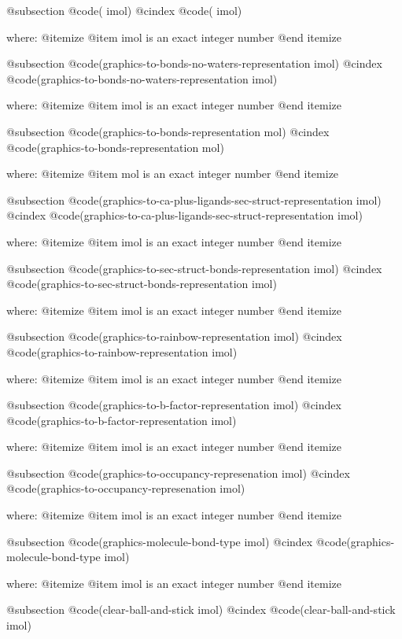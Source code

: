 @subsection @code{( imol)}
@cindex @code{( imol)}
 
where: 
 @itemize 
     @item imol is an exact integer number
 @end itemize


@subsection @code{(graphics-to-bonds-no-waters-representation imol)}
@cindex @code{(graphics-to-bonds-no-waters-representation imol)}
 
where: 
 @itemize 
     @item imol is an exact integer number
 @end itemize


@subsection @code{(graphics-to-bonds-representation mol)}
@cindex @code{(graphics-to-bonds-representation mol)}
 
where: 
 @itemize 
     @item mol is an exact integer number
 @end itemize


@subsection @code{(graphics-to-ca-plus-ligands-sec-struct-representation imol)}
@cindex @code{(graphics-to-ca-plus-ligands-sec-struct-representation imol)}
 
where: 
 @itemize 
     @item imol is an exact integer number
 @end itemize


@subsection @code{(graphics-to-sec-struct-bonds-representation imol)}
@cindex @code{(graphics-to-sec-struct-bonds-representation imol)}
 
where: 
 @itemize 
     @item imol is an exact integer number
 @end itemize


@subsection @code{(graphics-to-rainbow-representation imol)}
@cindex @code{(graphics-to-rainbow-representation imol)}
 
where: 
 @itemize 
     @item imol is an exact integer number
 @end itemize


@subsection @code{(graphics-to-b-factor-representation imol)}
@cindex @code{(graphics-to-b-factor-representation imol)}
 
where: 
 @itemize 
     @item imol is an exact integer number
 @end itemize


@subsection @code{(graphics-to-occupancy-represenation imol)}
@cindex @code{(graphics-to-occupancy-represenation imol)}
 
where: 
 @itemize 
     @item imol is an exact integer number
 @end itemize


@subsection @code{(graphics-molecule-bond-type imol)}
@cindex @code{(graphics-molecule-bond-type imol)}
 
where: 
 @itemize 
     @item imol is an exact integer number
 @end itemize


@subsection @code{(clear-ball-and-stick imol)}
@cindex @code{(clear-ball-and-stick imol)}
 

